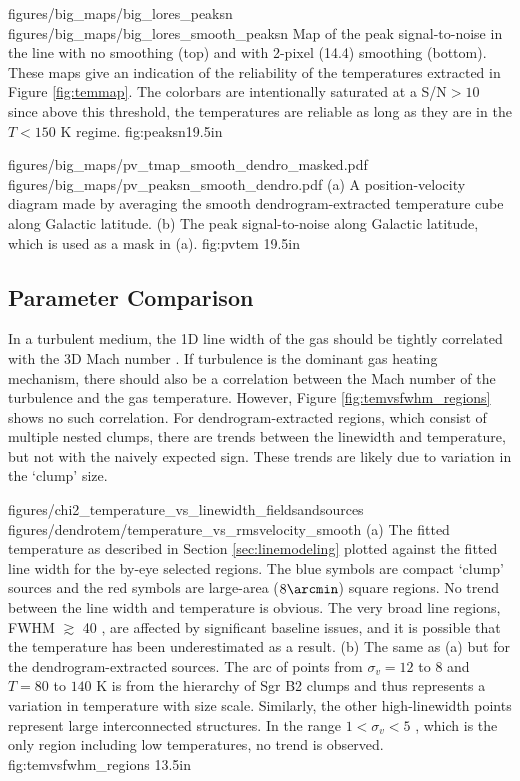 \RotFigureTwoAA
{figures/big_maps/big_lores_peaksn}
{figures/big_maps/big_lores_smooth_peaksn}
{Map of the peak signal-to-noise in the \para \threeohthree line with no
smoothing (top) and with 2-pixel (14.4\arcsec) smoothing (bottom).  
These maps give an indication of the reliability of the temperatures extracted
in Figure \ref{fig:temmap}.  The colorbars are intentionally saturated at a
S/N$>10$ since above this threshold, the temperatures are reliable as long as
they are in the $T<150$ K regime.
}
{fig:peaksn}{1}{9.5in}



\RotFigureTwoAA
{figures/big_maps/pv_tmap_smooth_dendro_masked.pdf}
{figures/big_maps/pv_peaksn_smooth_dendro.pdf}
{(a) A position-velocity diagram made by averaging the smooth
dendrogram-extracted temperature cube along Galactic latitude.  (b) The peak
signal-to-noise along Galactic latitude, which is used as a mask in (a).}
{fig:pvtem}
{1}{9.5in}

\subsection{Parameter Comparison}
In a turbulent medium, the 1D line width of the gas should be tightly
correlated with the 3D Mach number \citep[e.g.][]{Federrath2011a}.  If
turbulence is the dominant gas heating mechanism, there should also be a
correlation between the Mach number of the turbulence and the gas temperature.
However, Figure \ref{fig:temvsfwhm_regions} shows no such correlation.  For
dendrogram-extracted regions, which consist of multiple nested clumps, there
are trends between the linewidth and temperature, but not with the naively
expected sign.  These trends are likely due to variation in the `clump' size.

\FigureTwo
{figures/chi2_temperature_vs_linewidth_fieldsandsources}
{figures/dendrotem/temperature_vs_rmsvelocity_smooth} %
{(a) 
The fitted temperature as described in Section \ref{sec:linemodeling} plotted
against the fitted line width for the by-eye selected regions.  The blue
symbols are compact `clump' sources and the red symbols are large-area
($8\arcmin$) square regions.  No trend between the line width and temperature
is obvious.  The very broad line regions, FWHM $\gtrsim$ 40 \kms, are affected
by significant baseline issues, and it is possible that the temperature has been
underestimated as a result.
(b) The same as (a) but for the dendrogram-extracted sources.  The arc of points
from $\sigma_v=12$ to $8$ \kms and $T=80$ to $140$ K is from the hierarchy of
Sgr B2 clumps and thus represents a variation in temperature with size scale.
Similarly, the other high-linewidth points represent large interconnected
structures.  In the range $1 < \sigma_v < 5$ \kms, which is the only region
including low temperatures, no trend is observed.}
{fig:temvsfwhm_regions}
{1}{3.5in}



